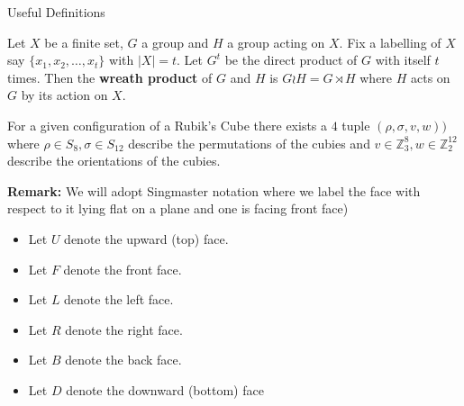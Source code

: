 \documentclass[final]{beamer}
\newlength{\colwidth}
\begin{document}
\begin{frame}[t]
\begin{columns}[t]
\begin{column}{\colwidth}
\begin{alertblock}{Useful Definitions}

Let $X$ be a finite set, $G$ a group and $H$ a group acting on $X$.
Fix a labelling of $X$ say $\{x_1,x_2, \dots, x_t\}$ with $| X | = t$.
Let $G^t$ be the direct product of $G$ with itself $t$ times.
Then the \textbf{wreath product} of $G$ and $H$ is $G \wr H = G \rtimes H$ where $H$ acts on $G$ by its action on $X$.





    

For a given configuration of a Rubik's Cube there exists a $4$ tuple $(\rho, \sigma, v, w))$ where $\rho \in S_8, \sigma \in S_{12}$ describe the permutations of the cubies and $v \in \mathbb Z_3^8, w \in \mathbb Z_2^{12}$ describe the orientations of the cubies.

\textbf{Remark:} 
We will adopt Singmaster notation where  
we label the face with respect to it lying
flat on a plane and one is facing front face)

\begin{itemize}
\item Let $U$ denote the upward (top) face.
\item Let $F$ denote the front face.
\item Let $L$ denote the left face.
\item Let $R$ denote the right face.
\item Let $B$ denote the back face.
\item Let $D$ denote the downward (bottom) face
\end{itemize}




\end{alertblock}
\end{column}
\end{columns}
\end{frame}
\end{document}
